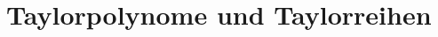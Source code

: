 \documentclass[../main.tex]{subfiles}
\begin{document}
\chapter{Taylorpolynome und Taylorreihen}
\end{document}
